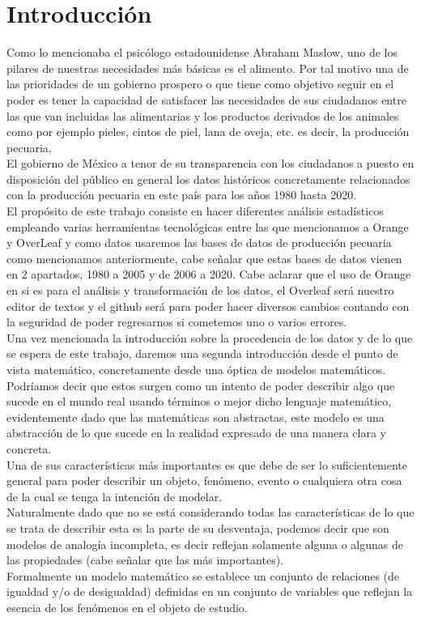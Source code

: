 \documentclass{article}
\begin{document}
\newpage

\section*{\Huge Introducción}
{ \large Como lo mencionaba el psicólogo estadounidense Abraham Maslow, uno de los pilares de nuestras necesidades más básicas es el alimento. Por tal motivo una de las prioridades de un gobierno prospero o que tiene como objetivo seguir en el poder es tener la capacidad de satisfacer las necesidades de sus ciudadanos entre las que van incluidas las alimentarias y los productos derivados de los animales como por ejemplo pieles, cintos de piel, lana de oveja, etc. es decir, la producción pecuaria. \\
El gobierno de México a tenor de su transparencia con los ciudadanos a puesto en disposición del público en general los datos históricos concretamente relacionados con la producción pecuaria en este país para los años 1980 hasta 2020. \\
El propósito de este trabajo consiste en hacer diferentes análisis estadísticos empleando varias herramientas tecnológicas entre las que mencionamos a Orange y OverLeaf y como datos usaremos las bases de datos de producción pecuaria como mencionamos anteriormente, cabe señalar que estas bases de datos vienen en 2 apartados, 1980 a 2005 y de 2006 a 2020.
Cabe aclarar que el uso de Orange en si es para el análisis y transformación de los datos, el Overleaf será nuestro editor de textos y el github será para poder hacer diversos cambios contando con la seguridad de poder regresarnos si cometemos uno o varios errores. \\
Una vez mencionada la introducción sobre la procedencia de los datos y de lo que se espera de este trabajo, daremos una segunda introducción desde el punto de vista matemático, concretamente desde una óptica de modelos matemáticos. \\
Podríamos decir que estos surgen como un intento de poder describir algo que sucede en el mundo real usando términos o mejor dicho lenguaje matemático, evidentemente dado que las matemáticas son abstractas, este modelo es una abstracción de lo que sucede en la realidad expresado de una manera clara y concreta.\\
Una de sus características más importantes es que debe de ser lo suficientemente general para poder describir un objeto, fenómeno, evento o cualquiera otra cosa de la cual se tenga la intención de modelar. \\  
Naturalmente dado que no se está considerando todas las características de lo que se trata de describir esta es la parte de su desventaja, podemos decir que son modelos de analogía incompleta, es decir reflejan solamente alguna o algunas de las propiedades (cabe señalar que las más importantes). \\
Formalmente un modelo matemático se establece un conjunto de relaciones (de igualdad y/o de desigualdad) definidas en un conjunto de variables que reflejan la esencia de los fenómenos en el objeto de estudio.


}
\end{document}
